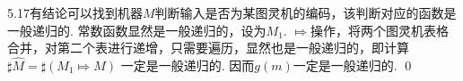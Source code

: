 \begin{pf} \rm \;
    5.17有结论可以找到机器$M$判断输入是否为某图灵机的编码，该判断对应的函数是一般递归的. 常数函数显然是一般递归的，设为$M_1$. $\Mapsto$操作，将两个图灵机表格合并，对第二个表进行递增，只需要遍历，显然也是一般递归的，即计算$\sharp\hat{M} = \sharp (M_1 \Mapsto M)$ 一定是一般递归的. 因而$g(m)$一定是一般递归的.
    \qed
\end{pf}